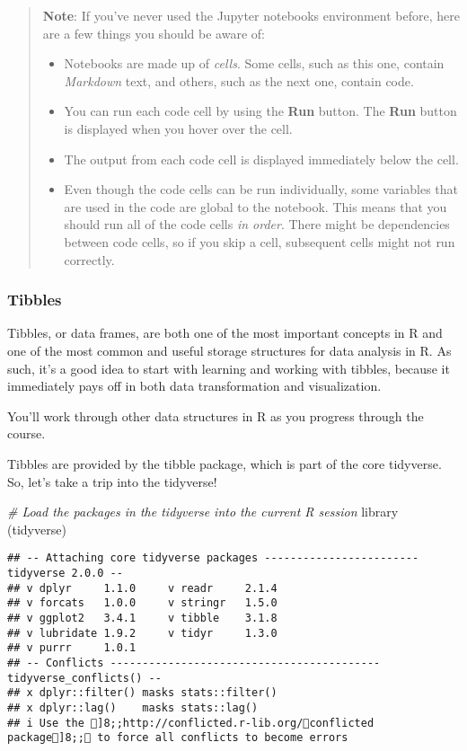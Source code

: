 \documentclass[
]{article}
\newenvironment{Shaded}{\begin{snugshade}}{\end{snugshade}}
\newcommand{\CommentTok}[1]{\textcolor[rgb]{0.56,0.35,0.01}{\textit{#1}}}
\newcommand{\FunctionTok}[1]{\textcolor[rgb]{0.00,0.00,0.00}{#1}}
\newcommand{\NormalTok}[1]{#1}
\providecommand{\tightlist}{%
  \setlength{\itemsep}{0pt}\setlength{\parskip}{0pt}}
\begin{document}
\begin{quote}
\textbf{Note}: If you've never used the Jupyter notebooks environment
before, here are a few things you should be aware of:

\begin{itemize}
\tightlist
\item
  Notebooks are made up of \emph{cells}. Some cells, such as this one,
  contain \emph{Markdown} text, and others, such as the next one,
  contain code.
\item
  You can run each code cell by using the \textbf{Run} button. The
  \textbf{Run} button is displayed when you hover over the cell.
\item
  The output from each code cell is displayed immediately below the
  cell.
\item
  Even though the code cells can be run individually, some variables
  that are used in the code are global to the notebook. This means that
  you should run all of the code cells \emph{in order}. There might be
  dependencies between code cells, so if you skip a cell, subsequent
  cells might not run correctly.
\end{itemize}
\end{quote}

\hypertarget{tibbles}{%
\subsubsection{Tibbles}\label{tibbles}}

Tibbles, or data frames, are both one of the most important concepts in
R and one of the most common and useful storage structures for data
analysis in R. As such, it's a good idea to start with learning and
working with tibbles, because it immediately pays off in both data
transformation and visualization.

You'll work through other data structures in R as you progress through
the course.

Tibbles are provided by the tibble package, which is part of the core
tidyverse. So, let's take a trip into the tidyverse!

\begin{Shaded}
\begin{Highlighting}[]
\CommentTok{\# Load the packages in the tidyverse into the current R session}
\FunctionTok{library}\NormalTok{ (tidyverse)}
\end{Highlighting}
\end{Shaded}

\begin{verbatim}
## -- Attaching core tidyverse packages ------------------------ tidyverse 2.0.0 --
## v dplyr     1.1.0     v readr     2.1.4
## v forcats   1.0.0     v stringr   1.5.0
## v ggplot2   3.4.1     v tibble    3.1.8
## v lubridate 1.9.2     v tidyr     1.3.0
## v purrr     1.0.1     
## -- Conflicts ------------------------------------------ tidyverse_conflicts() --
## x dplyr::filter() masks stats::filter()
## x dplyr::lag()    masks stats::lag()
## i Use the ]8;;http://conflicted.r-lib.org/conflicted package]8;; to force all conflicts to become errors
\end{verbatim}
\end{document}
